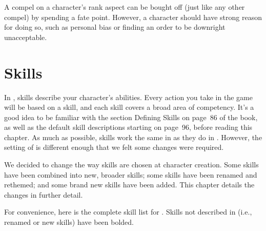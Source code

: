 \documentclass[12pt,titlepage,openany]{book}
\begin{document}
A compel on a character's rank aspect can be bought off (just like any other
compel) by spending a fate point. However, a character should have strong
reason for doing so, such as personal bias or finding an order to be downright
unacceptable.



\chapter{Skills}\label{chap:skills}

In \Fate{}, skills describe your character's abilities. Every action you take
in the game will be based on a skill, and each skill covers a broad area of
competency. It's a good idea to be familiar with the section Defining Skills on
page~86 of the \FateCore{} book, as well as the default skill descriptions
starting on page~96, before reading this chapter. As much as possible, skills
work the same in \StarTrekFate{} as they do in \FateCore{}. However, the
setting of \StarTrek{} is different enough that we felt some changes were
required.

We decided to change the way skills are chosen at character creation. Some
skills have been combined into new, broader skills; some skills have been
renamed and rethemed; and some brand new skills have been added. This chapter
details the changes in further detail.

For convenience, here is the complete skill list for \StarTrekFate{}. Skills
not described in \FateCore{} (i.e., renamed or new skills) have been bolded.
\end{document}
